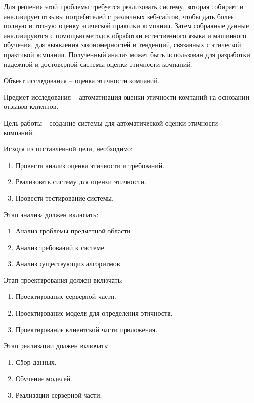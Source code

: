 \documentclass[PI, VKR]{HSEUniversity}
\begin{document}
Для решения этой проблемы требуется реализовать систему, которая собирает и анализирует отзывы потребителей с различных веб-сайтов, чтобы дать более полную и точную оценку этической практики компании. Затем собранные данные анализируются с помощью методов обработки естественного языка и машинного обучения, для выявления закономерностей и тенденций, связанных с этической практикой компании. Полученный анализ может быть использован для разработки надежной и достоверной системы оценки этичности компаний.

Объект исследования -- оценка этичности компаний.

Предмет исследования -- автоматизация оценки этичности компаний на основании отзывов клиентов.

Цель работы -- создание системы для автоматической оценки этичности компаний.

Исходя из поставленной цели, необходимо:
\begin{enumerate}
\item Провести анализ оценки этичности и требований.
\item Реализовать систему для оценки этичности.
\item Провести тестирование системы.
\end{enumerate}

Этап анализа должен включать:
\begin{enumerate}
\item Анализ проблемы предметной области.
\item Анализ требований к системе.
\item Анализ существующих алгоритмов.
\end{enumerate}

Этап проектирования должен включать:
\begin{enumerate}
\item Проектирование серверной части.
\item Проектирование модели для определения этичности.
\item Проектирование клиентской части приложения.
\end{enumerate}

Этап реализации должен включать:
\begin{enumerate}
\item Сбор данных.
\item Обучение моделей.
\item Реализации серверной части.
\end{enumerate}
\end{document}
